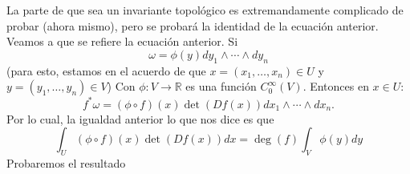 \documentclass[12pt]{report}
\theoremstyle{largebreak}
\begin{document}
    La parte de que sea un invariante topológico es extremandamente complicado de probar (ahora mismo), pero se probará la identidad de la ecuación anterior. Veamos a que se refiere la ecuación anterior. Si
    \begin{equation*}
        \omega = \phi(y)dy_1\wedge\cdots\wedge dy_n
    \end{equation*}
    (para esto, estamos en el acuerdo de que $x=\left(x_1,\dots,x_n\right)\in U$ y $y=\left(y_1,\dots, y_n\right)\in V$) Con $\phi:V\rightarrow \mathbb{R}$ es una función $C_0^{\infty}(V)$. Entonces en $x\in U$:
    \begin{equation*}
        f^*\omega = \left(\phi\circ f\right)(x)\det\left(Df(x)\right)dx_1\wedge\cdots\wedge dx_n.
    \end{equation*}
    Por lo cual, la igualdad anterior lo que nos dice es que
    \begin{equation*}
        \int_{U}\left(\phi\circ f\right)(x)\det(Df(x))dx=\deg\left(f\right)\int_{V}\phi(y)dy
    \end{equation*}
    Probaremos el resultado
\end{document}
